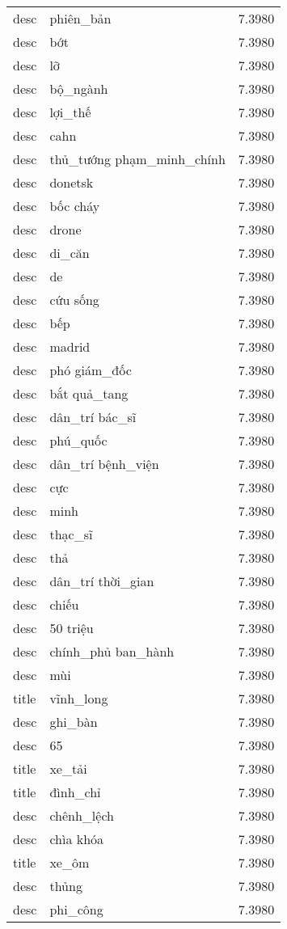 \documentclass{article}
\begin{document}
\begin{tabular}{lll}
desc & phiên\_bản & 7.3980\\
desc & bớt & 7.3980\\
desc & lỡ & 7.3980\\
desc & bộ\_ngành & 7.3980\\
desc & lợi\_thế & 7.3980\\
desc & cahn & 7.3980\\
desc & thủ\_tướng phạm\_minh\_chính & 7.3980\\
desc & donetsk & 7.3980\\
desc & bốc cháy & 7.3980\\
desc & drone & 7.3980\\
desc & di\_căn & 7.3980\\
desc & de & 7.3980\\
desc & cứu sống & 7.3980\\
desc & bếp & 7.3980\\
desc & madrid & 7.3980\\
desc & phó giám\_đốc & 7.3980\\
desc & bắt quả\_tang & 7.3980\\
desc & dân\_trí bác\_sĩ & 7.3980\\
desc & phú\_quốc & 7.3980\\
desc & dân\_trí bệnh\_viện & 7.3980\\
desc & cực & 7.3980\\
desc & minh & 7.3980\\
desc & thạc\_sĩ & 7.3980\\
desc & thả & 7.3980\\
desc & dân\_trí thời\_gian & 7.3980\\
desc & chiếu & 7.3980\\
desc & 50 triệu & 7.3980\\
desc & chính\_phủ ban\_hành & 7.3980\\
desc & mùi & 7.3980\\
title & vĩnh\_long & 7.3980\\
desc & ghi\_bàn & 7.3980\\
desc & 65 & 7.3980\\
title & xe\_tải & 7.3980\\
title & đình\_chỉ & 7.3980\\
desc & chênh\_lệch & 7.3980\\
desc & chìa khóa & 7.3980\\
title & xe\_ôm & 7.3980\\
desc & thủng & 7.3980\\
desc & phi\_công & 7.3980\\

\end{tabular}
\end{document}
